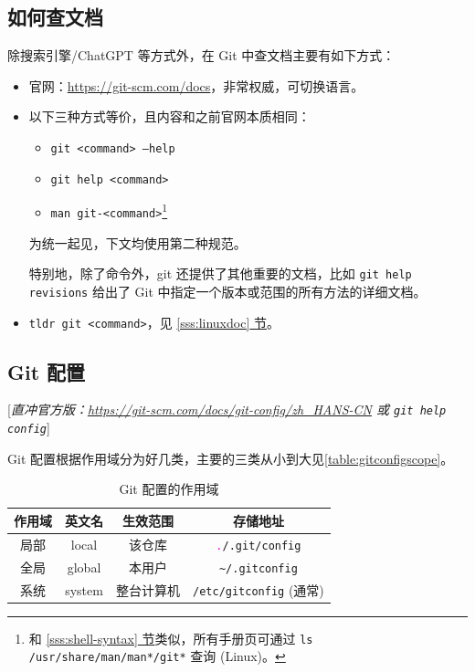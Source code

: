 \documentclass{article}
\begin{document}
	\subsection{如何查文档}
	\label{sss:gitdoc}

	除搜索引擎/ChatGPT 等方式外，在 Git 中查文档主要有如下方式：
	\begin{itemize}
		\itemsep0pt
		\item 官网：\url{https://git-scm.com/docs}，非常权威，可切换语言。
		\item 以下三种方式等价，且内容和之前官网本质相同：
			\begin{itemize}
				\itemsep0pt
				\item \texttt{git <command> --help}
				\color{red}\item \texttt{git help <command>}\normalcolor
				\item \texttt{man git-<command>}\footnote{和 \hyperref[sss:shell-syntax]{\ref*{sss:shell-syntax} 节}类似，所有手册页可通过 \texttt{ls /usr/share/man/man*/git*} 查询 (Linux)。}
			\end{itemize}
			为统一起见，下文均使用第二种规范。

			特别地，除了命令外，git 还提供了其他重要的文档，比如 \texttt{git help revisions} 给出了 Git 中指定一个版本或范围的所有方法的详细文档。
		\item \texttt{tldr git <command>}，见 \hyperref[sss:linuxdoc]{\ref*{sss:linuxdoc} 节}。
	\end{itemize}

	\subsection{Git 配置}
	\label{sss:gitconfig}

	\textcolor{properpurple}{[\textit{直冲官方版：\url{https://git-scm.com/docs/git-config/zh_HANS-CN} 或 \texttt{git help config}}]}

	Git 配置根据作用域分为好几类，主要的三类从小到大见\autoref{table:gitconfigscope}。

	\begin{table}[htb]
		\centering
		\begin{tabular}{|c|c|c|c|}
			\hline
				作用域 & 英文名 & 生效范围 & 存储地址 \\
			\hline\hline
				局部 & local & 该仓库 & \texttt{\textcolor{fuchsia}.\footnotemark/.git/config} \\
			\hline
				全局 & global & 本用户 & \verb!~/.gitconfig! \\
			\hline
				系统 & system & 整台计算机 & \texttt{/etc/gitconfig} (通常) \\
			\hline
		\end{tabular}
		\caption{Git 配置的作用域}
		\label{table:gitconfigscope}
	\end{table}
\end{document}
